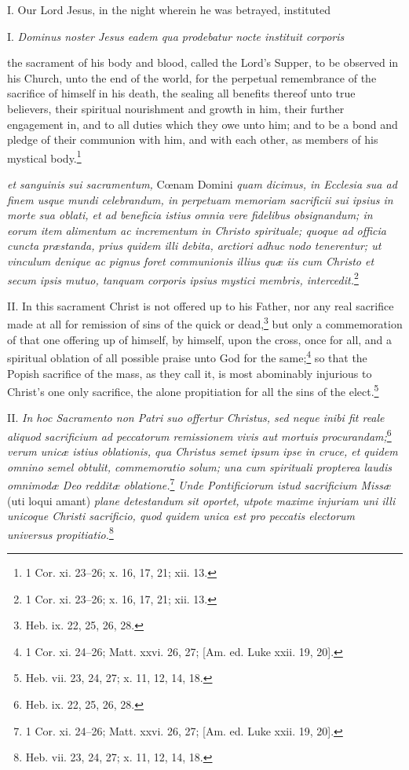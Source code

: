 I. Our Lord Jesus, in the night wherein he was betrayed, instituted

I. \emph{Dominus noster Jesus eadem qua prodebatur nocte instituit corporis }

the sacrament of his body and blood, called the Lord's Supper, to be observed in his Church, unto the end of the world, for the perpetual remembrance of the sacrifice of himself in his death, the sealing all benefits thereof unto true believers, their spiritual nourishment and growth in him, their further engagement in, and to all duties which they owe unto him; and to be a bond and pledge of their communion with him, and with each other, as members of his mystical body.\footnote{1 Cor. xi. 23–26; x. 16, 17, 21; xii. 13.}

\emph{et sanguinis sui sacramentum, }Cœnam Domini\emph{ quam dicimus, in Ecclesia sua ad finem usque mundi celebrandum, in perpetuam memoriam sacrificii sui ipsius in morte sua oblati, et ad beneficia istius omnia vere fidelibus obsignandum; in eorum item alimentum ac incrementum in Christo spirituale; quoque ad officia cuncta præstanda, prius quidem illi debita, arctiori adhuc nodo tenerentur; ut vinculum denique ac pignus foret communionis illius quæ iis cum Christo et secum ipsis mutuo, tanquam corporis ipsius mystici membris, intercedit.}\footnote{1 Cor. xi. 23–26; x. 16, 17, 21; xii. 13.}

II. In this sacrament Christ is not offered up to his Father, nor any real sacrifice made at all for remission of sins of the quick or dead,\footnote{Heb. ix. 22, 25, 26, 28.} but only a commemoration of that one offering up of himself, by himself, upon the cross, once for all, and a spiritual oblation of all possible praise unto God for the same;\footnote{1 Cor. xi. 24–26; Matt. xxvi. 26, 27; [Am. ed. Luke xxii. 19, 20].} so that the Popish sacrifice of the mass, as they call it, is most abominably injurious to Christ's one only sacrifice, the alone propitiation for all the sins of the elect.\footnote{Heb. vii. 23, 24, 27; x. 11, 12, 14, 18.}

II. \emph{In hoc Sacramento non Patri suo offertur Christus, sed neque inibi fit reale aliquod sacrificium ad peccatorum remissionem vivis aut mortuis procurandam;}\footnote{Heb. ix. 22, 25, 26, 28.}\emph{ verum unicæ istius oblationis, qua Christus semet ipsum ipse in cruce, et quidem omnino semel obtulit, commemoratio solum; una cum spirituali propterea laudis omnimodæ Deo redditæ oblatione.}\footnote{1 Cor. xi. 24–26; Matt. xxvi. 26, 27; [Am. ed. Luke xxii. 19, 20].}\emph{ Unde Pontificiorum istud sacrificium Missæ }(uti loqui amant)\emph{ plane detestandum sit oportet, utpote maxime injuriam uni illi unicoque Christi sacrificio, quod quidem unica est pro peccatis electorum universus propitiatio.}\footnote{Heb. vii. 23, 24, 27; x. 11, 12, 14, 18.}

